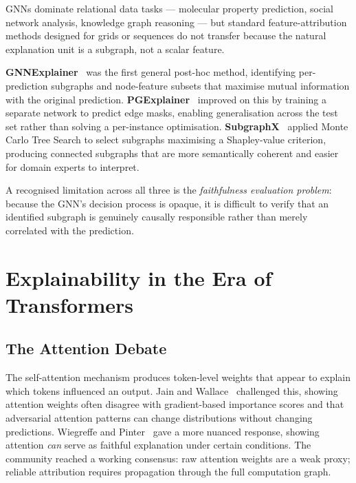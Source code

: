 \documentclass[12pt]{article}
\begin{document}
GNNs dominate relational data tasks --- molecular property prediction, social
network analysis, knowledge graph reasoning --- but standard feature-attribution
methods designed for grids or sequences do not transfer because the natural
explanation unit is a subgraph, not a scalar feature.

\textbf{GNNExplainer}~\cite{ying2019gnnexplainer} was the first general post-hoc
method, identifying per-prediction subgraphs and node-feature subsets that
maximise mutual information with the original prediction.
\textbf{PGExplainer}~\cite{luo2020pgexplainer} improved on this by training a
separate network to predict edge masks, enabling generalisation across the test
set rather than solving a per-instance optimisation.
\textbf{SubgraphX}~\cite{yuan2021subgraphx} applied Monte Carlo Tree Search to
select subgraphs maximising a Shapley-value criterion, producing connected
subgraphs that are more semantically coherent and easier for domain experts to
interpret.

A recognised limitation across all three is the \emph{faithfulness evaluation
problem}: because the GNN's decision process is opaque, it is difficult to verify
that an identified subgraph is genuinely causally responsible rather than merely
correlated with the prediction.

\section{Explainability in the Era of Transformers}
\label{sec:transformers}

\subsection{The Attention Debate}

The self-attention mechanism produces token-level weights that appear to explain
which tokens influenced an output. Jain and Wallace~\cite{jain2019attention}
challenged this, showing attention weights often disagree with gradient-based
importance scores and that adversarial attention patterns can change distributions
without changing predictions. Wiegreffe and
Pinter~\cite{wiegreffe2019attention} gave a more nuanced response, showing
attention \emph{can} serve as faithful explanation under certain conditions. The
community reached a working consensus: raw attention weights are a weak proxy;
reliable attribution requires propagation through the full computation graph.
\end{document}

